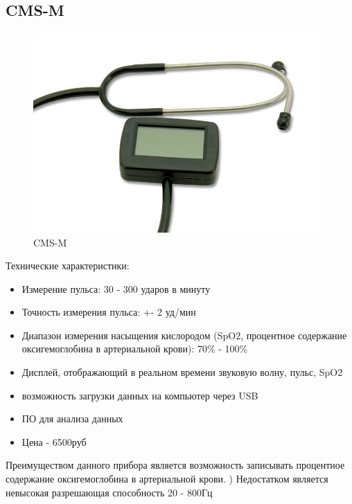 \documentclass[../paper.tex]{subfiles}
\begin{document}
\subsection{CMS-M}
\begin{figure}[H]
\centering
\includegraphics[width=11cm]{images/cms-m}
\caption{CMS-M}
\end{figure}

Технические характеристики:\cite{cms-m}
\begin{itemize}
  \item Измерение пульса: 30 - 300 ударов в минуту
  \item Точность измерения пульса: +- 2 уд/мин
  \item Диапазон измерения насыщения кислородом (SpO2, процентное содержание оксигемоглобина в артериальной крови): 70\% - 100\%
  \item Дисплей, отображающий в реальном времени звуковую волну, пульс, SpO2
  \item возможность загрузки данных на компьютер через USB
  \item ПО для анализа данных
  \item Цена - 6500руб
\end{itemize}

Преимуществом данного прибора является возможность записывать процентное содержание оксигемоглобина в артериальной крови. ) Недостатком является невысокая разрешающая способность 20 - 800Гц
\end{document}
